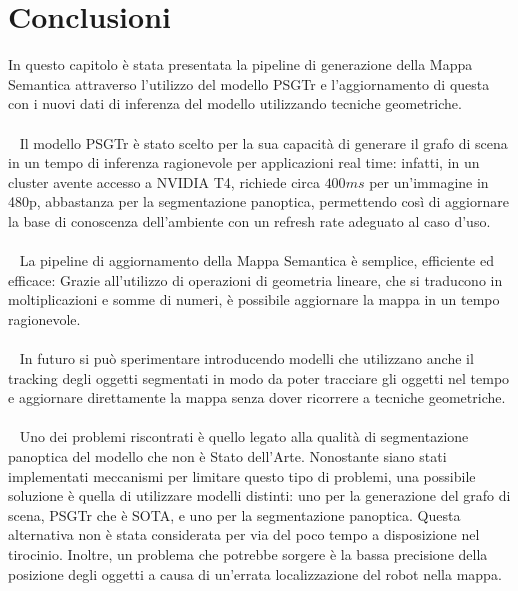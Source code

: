 \section{Conclusioni}
In questo capitolo è stata presentata la pipeline di generazione della Mappa Semantica attraverso l'utilizzo del modello PSGTr e l'aggiornamento di questa con i nuovi dati di inferenza del modello utilizzando tecniche geometriche.\\\\
~
Il modello PSGTr è stato scelto per la sua capacità di generare il grafo di scena in un tempo di inferenza ragionevole per applicazioni real time: infatti, in un cluster avente accesso a NVIDIA T4, richiede circa $400ms$ per un'immagine in 480p, abbastanza per la segmentazione panoptica, permettendo così di aggiornare la base di conoscenza dell'ambiente con un refresh rate adeguato al caso d'uso.\\\\
~
La pipeline di aggiornamento della Mappa Semantica è semplice, efficiente ed efficace: Grazie all'utilizzo di operazioni di geometria lineare, che si traducono in moltiplicazioni e somme di numeri, è possibile aggiornare la mappa in un tempo ragionevole.\\\\
~
In futuro si può sperimentare introducendo modelli \cite{yang2023pvsg} che utilizzano anche il tracking degli oggetti segmentati in modo da poter tracciare gli oggetti nel tempo e aggiornare direttamente la mappa senza dover ricorrere a tecniche geometriche.\\\\
~
Uno dei problemi riscontrati è quello legato alla qualità di segmentazione panoptica del modello che non è Stato dell'Arte. Nonostante siano stati implementati meccanismi per limitare questo tipo di problemi, una possibile soluzione è quella di utilizzare modelli distinti: uno per la generazione del grafo di scena, PSGTr che è SOTA, e uno per la segmentazione panoptica. Questa alternativa non è stata considerata per via del poco tempo a disposizione nel tirocinio. Inoltre, un problema che potrebbe sorgere è la bassa precisione della posizione degli oggetti a causa di un'errata localizzazione del robot nella mappa.
